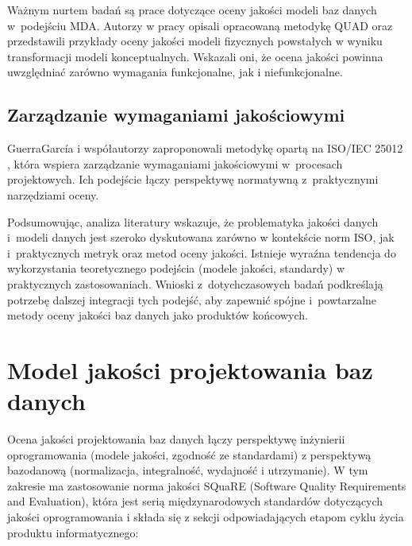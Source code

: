 Ważnym nurtem badań są prace dotyczące oceny jakości modeli baz danych w~podejściu MDA. Autorzy w pracy \cite{Dubielewicz2007Eval} opisali opracowaną metodykę QUAD oraz przedstawili przykłady oceny jakości modeli fizycznych powstałych w wyniku transformacji modeli konceptualnych. Wskazali oni, że ocena jakości powinna uwzględniać zarówno wymagania funkcjonalne, jak i niefunkcjonalne.

\subsection{Zarządzanie wymaganiami jakościowymi}

GuerraGarcía i współautorzy \cite{GuerraGarcia2023} zaproponowali metodykę opartą na ISO/IEC 25012 \cite{ISO25012}, która wspiera zarządzanie wymaganiami jakościowymi w~procesach projektowych. Ich podejście łączy perspektywę normatywną z~praktycznymi narzędziami oceny.

\medskip

Podsumowując, analiza literatury wskazuje, że problematyka jakości danych i~modeli danych jest szeroko dyskutowana zarówno w kontekście norm ISO, jak i~praktycznych metryk oraz metod oceny jakości. Istnieje wyraźna tendencja do wykorzystania teoretycznego podejścia (modele jakości, standardy) w praktycznych zastosowaniach. Wnioski z~dotychczasowych badań podkreślają potrzebę dalszej integracji tych podejść, aby zapewnić spójne i~powtarzalne metody oceny jakości baz danych jako produktów końcowych.

\section{Model jakości projektowania baz danych}

Ocena jakości projektowania baz danych łączy perspektywę inżynierii oprogramowania (modele jakości, zgodność ze standardami) z perspektywą bazodanową (normalizacja, integralność, wydajność i utrzymanie). W tym zakresie ma zastosowanie norma jakości SQuaRE (Software Quality Requirements and Evaluation), która jest serią międzynarodowych standardów dotyczących jakości oprogramowania i składa się z sekcji odpowiadających etapom cyklu życia produktu informatycznego:

